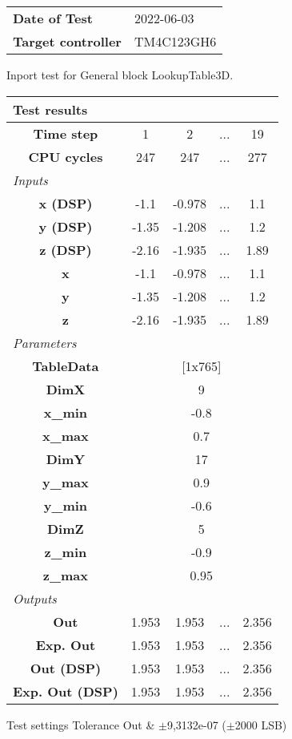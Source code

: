 \begin{tabular}{l l}
\textbf{Date of Test} & 2022-06-03 \tabularnewline
\textbf{Target controller} & TM4C123GH6 \tabularnewline
\end{tabular}
\vspace{1ex}
Inport test for General block LookupTable3D.

\vspace{1em}
\begin{tabularx}{\textwidth}{|c|c|c|>{\centering\arraybackslash}X|c|}
\hline
\multicolumn{5}{|l|}{\cellcolor[gray]{0.8}\textbf{Test results}} \tabularnewline \hline
\textbf{Time step} & 1 & 2 & ... & 19 \tabularnewline \hline
\textbf{CPU cycles} & 247 & 247 & ... & 277 \tabularnewline \hline
\multicolumn{5}{|l|}{\cellcolor[gray]{0.9}\textit{Inputs}} \tabularnewline \hline
\textbf{x (DSP)} & -1.1 & -0.978 & ... & 1.1 \tabularnewline \hline
\textbf{y (DSP)} & -1.35 & -1.208 & ... & 1.2 \tabularnewline \hline
\textbf{z (DSP)} & -2.16 & -1.935 & ... & 1.89 \tabularnewline \hline
\textbf{x} & -1.1 & -0.978 & ... & 1.1 \tabularnewline \hline
\textbf{y} & -1.35 & -1.208 & ... & 1.2 \tabularnewline \hline
\textbf{z} & -2.16 & -1.935 & ... & 1.89 \tabularnewline \hline
\multicolumn{5}{|l|}{\cellcolor[gray]{0.9}\textit{Parameters}} \tabularnewline \hline
\textbf{TableData} & \multicolumn{4}{c|}{[1x765]} \tabularnewline \hline
\textbf{DimX} & \multicolumn{4}{c|}{9} \tabularnewline \hline
\textbf{x\_min} & \multicolumn{4}{c|}{-0.8} \tabularnewline \hline
\textbf{x\_max} & \multicolumn{4}{c|}{0.7} \tabularnewline \hline
\textbf{DimY} & \multicolumn{4}{c|}{17} \tabularnewline \hline
\textbf{y\_max} & \multicolumn{4}{c|}{0.9} \tabularnewline \hline
\textbf{y\_min} & \multicolumn{4}{c|}{-0.6} \tabularnewline \hline
\textbf{DimZ} & \multicolumn{4}{c|}{5} \tabularnewline \hline
\textbf{z\_min} & \multicolumn{4}{c|}{-0.9} \tabularnewline \hline
\textbf{z\_max} & \multicolumn{4}{c|}{0.95} \tabularnewline \hline
\multicolumn{5}{|l|}{\cellcolor[gray]{0.9}\textit{Outputs}} \tabularnewline \hline
\textbf{Out} & 1.953 & 1.953 & ... & 2.356 \tabularnewline \hline
\textbf{Exp. Out} & 1.953 & 1.953 & ... & 2.356 \tabularnewline \hline
\textbf{Out (DSP)} & 1.953 & 1.953 & ... & 2.356 \tabularnewline \hline
\textbf{Exp. Out (DSP)} & 1.953 & 1.953 & ... & 2.356 \tabularnewline \hline
\end{tabularx}
\vspace{1ex}

\begin{XtoCtabular}{Test settings}
Tolerance Out & $\pm$9,3132e-07 ($\pm$2000 LSB) \tabularnewline \hline
\end{XtoCtabular}

